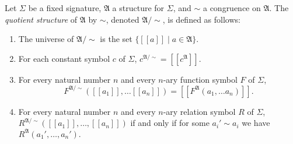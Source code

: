 \documentclass[12pt]{article}
\newcommand{\eqclass}[1]{[\![#1]\!]}
\newcommand{\set}[1]{\{#1\}}
\newcommand{\A}{\mathfrak{A}}
\begin{document}
Let $\Sigma$ be a fixed signature, $\A$ a structure for $\Sigma$, and $\sim$ a congruence on $\A$. The \emph{quotient structure} of $\A$ by $\sim$, denoted $\A/\!\sim$, is defined as follows:
\begin{enumerate}
  \item The universe of $\A/\!\sim$ is the set $\set{\eqclass{a} \mid a \in \A}$.
  \item For each constant symbol $c$ of $\Sigma$, \(c^{\A/\!\sim} = \eqclass{c^\A}\).
 \item For every natural number $n$ and every $n$-ary function symbol $F$ of $\Sigma$,
  		 \[
		 F^{\A/\!\sim}(\eqclass{a_1}, \ldots \eqclass{a_n}) = \eqclass{F^\A(a_1, \ldots a_n)}.
		 \]
  \item For every natural number $n$ and every $n$-ary relation symbol $R$ of $\Sigma$, 
  		\(R^{\A/\!\sim}(\eqclass{a_1}, \ldots, \eqclass{a_n})\) if and only if for some \(a_i' \sim a_i\) 
		we have \(R^\A(a_1', \ldots, a_n').\)
\end{enumerate}
\end{document}
